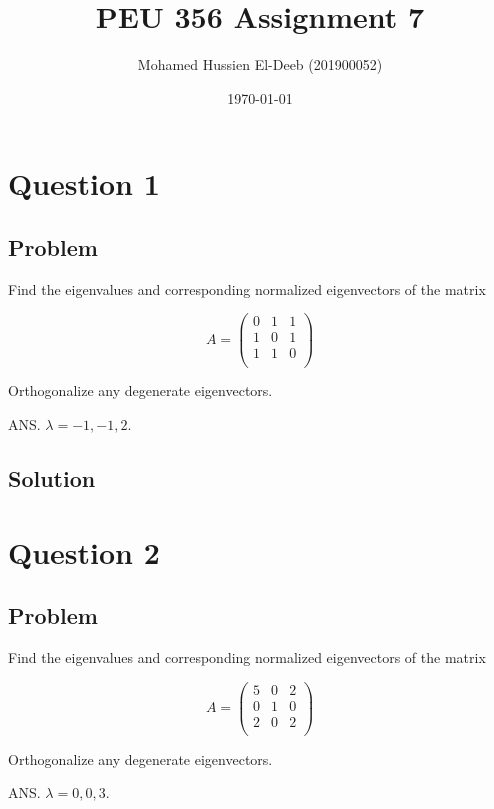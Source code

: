 \documentclass[12pt]{article}
\title{PEU 356 Assignment 7}
\author{Mohamed Hussien El-Deeb (201900052)}
\date{\today}
\begin{document}
\maketitle
\tableofcontents
\hypersetup{linkcolor=RoyalBlue4}

\newpage
\section{Question 1}

\subsection{Problem}

Find the eigenvalues and corresponding normalized eigenvectors of the matrix

\[
    A = \begin{pmatrix}
        0 & 1 & 1 \\
        1 & 0 & 1 \\
        1 & 1 & 0 \\
    \end{pmatrix}
\]

Orthogonalize any degenerate eigenvectors.

ANS. \(\lambda = -1, -1, 2. \)

\subsection{Solution}

\newpage
\section{Question 2}

\subsection{Problem}

Find the eigenvalues and corresponding normalized eigenvectors of the matrix

\[
    A = \begin{pmatrix}
        5 & 0 & 2 \\
        0 & 1 & 0 \\
        2 & 0 & 2 \\
    \end{pmatrix}
\]

Orthogonalize any degenerate eigenvectors.

ANS. \(\lambda = 0, 0, 3. \)
\end{document}
